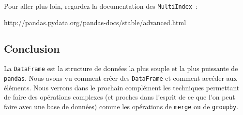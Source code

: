     Pour aller plus loin, regardez la documentation des
\texttt{MultiIndex}~:

http://pandas.pydata.org/pandas-docs/stable/advanced.html

    \hypertarget{conclusion}{%
\subsection{Conclusion}\label{conclusion}}

    La \texttt{DataFrame} est la structure de données la plus souple et la
plus puissante de \texttt{pandas}. Nous avons vu comment créer des
\texttt{DataFrame} et comment accéder aux éléments. Nous verrons dans le
prochain complément les techniques permettant de faire des opérations
complexes (et proches dans l'esprit de ce que l'on peut faire avec une
base de données) comme les opérations de \texttt{merge} ou de
\texttt{groupby}.


    
    
    
